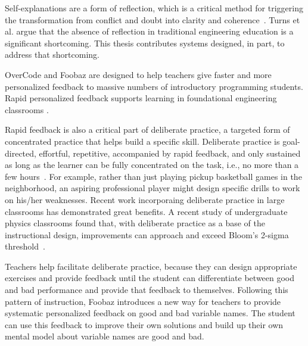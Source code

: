 Self-explanations are a form of reflection, which is a critical method for triggering the transformation from conflict and doubt into clarity and coherence~\cite{dewey1933}. Turns et al. \cite{asee} argue that the absence of reflection in traditional engineering education is a significant shortcoming. This thesis contributes systems designed, in part, to address that shortcoming.




OverCode and Foobaz are designed to help teachers give faster and more personalized feedback to massive numbers of introductory programming students. Rapid personalized feedback supports learning in foundational engineering classrooms \cite{ieeeRapidFeedback}. 

Rapid feedback is also a critical part of deliberate practice, a targeted form of concentrated practice that helps build a specific skill. Deliberate practice is goal-directed, effortful, repetitive, accompanied by rapid feedback, and only sustained as long as the learner can be fully concentrated on the task, i.e., no more than a few hours~\cite{Gobet2012}. For example, rather than just playing pickup basketball games in the neighborhood, an aspiring professional player might design specific drills to work on his/her weaknesses. Recent work incorporaing deliberate practice in large classrooms has demonstrated great benefits. A recent study of undergraduate physics classrooms found that, with deliberate practice as a base of the instructional design, improvements can approach and exceed Bloom's 2-sigma threshold~\cite{Deslauriers862}.

Teachers help facilitate deliberate practice, because they can design appropriate exercises and provide feedback until the student can differentiate between good and bad performance and provide that feedback to themselves. Following this pattern of instruction, Foobaz introduces a new way for teachers to provide systematic personalized feedback on good and bad variable names. The student can use this feedback to improve their own solutions and build up their own mental model about variable names are good and bad.


